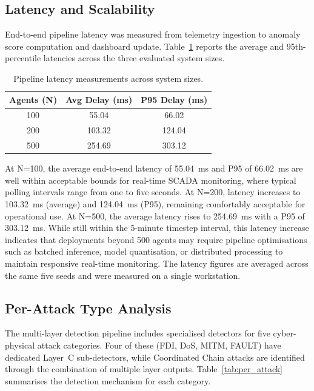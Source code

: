 \subsection{Latency and Scalability}

End-to-end pipeline latency was measured from telemetry ingestion to anomaly score computation and dashboard update. Table~\ref{tab:latency} reports the average and 95th-percentile latencies across the three evaluated system sizes.

\begin{table}[H]
\centering
\caption{Pipeline latency measurements across system sizes.}
\label{tab:latency}
\begin{tabular}{|c|c|c|}
\hline
\textbf{Agents (N)} & \textbf{Avg Delay (ms)} & \textbf{P95 Delay (ms)} \\ \hline
100 & 55.04 & 66.02 \\ \hline
200 & 103.32 & 124.04 \\ \hline
500 & 254.69 & 303.12 \\ \hline
\end{tabular}
\end{table}

\noindent
At N=100, the average end-to-end latency of 55.04~ms and P95 of 66.02~ms are well within acceptable bounds for real-time SCADA monitoring, where typical polling intervals range from one to five seconds. At N=200, latency increases to 103.32~ms (average) and 124.04~ms (P95), remaining comfortably acceptable for operational use. At N=500, the average latency rises to 254.69~ms with a P95 of 303.12~ms. While still within the 5-minute timestep interval, this latency increase indicates that deployments beyond 500 agents may require pipeline optimisations such as batched inference, model quantisation, or distributed processing to maintain responsive real-time monitoring. The latency figures are averaged across the same five seeds and were measured on a single workstation.


\subsection{Per-Attack Type Analysis}

The multi-layer detection pipeline includes specialised detectors for five cyber-physical attack categories. Four of these (FDI, DoS, MITM, FAULT) have dedicated Layer~C sub-detectors, while Coordinated Chain attacks are identified through the combination of multiple layer outputs. Table~\ref{tab:per_attack} summarises the detection mechanism for each category.

